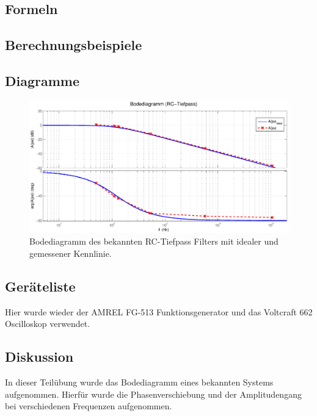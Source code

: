 \documentclass[12pt,a4paper,ngerman]{article}
\begin{document}
\subsection{Formeln}

\subsection{Berechnungsbeispiele}

\subsection{Diagramme}
\begin{figure}[H]
\centering
\includegraphics[width=\textwidth]{figures/bode_rc.eps} 
\caption{Bodediagramm des bekannten RC-Tiefpass Filters mit idealer und gemessener Kennlinie.}
\label{fig:bode_bek}
\end{figure}


\subsection{Geräteliste}
Hier wurde wieder der AMREL FG-513 Funktionsgenerator und das Voltcraft 662 Oscilloskop verwendet.

\subsection{Diskussion}
In dieser Teilübung wurde das Bodediagramm eines bekannten Systems aufgenommen. Hierfür wurde die Phasenverschiebung und der Amplitudengang bei verschiedenen Frequenzen aufgenommen. 



 



   
\end{document}
